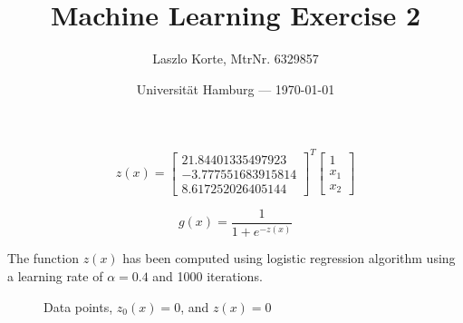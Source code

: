 \documentclass[parskip=half,a4paper]{scrartcl}
\title{Machine Learning Exercise 2}
\author{Laszlo Korte, MtrNr. 6329857}
\date{Universität Hamburg --- \today}
\begin{document}
\maketitle

$$
z(x) = \begin{bmatrix}
21.84401335497923 \\
-3.777551683915814 \\
8.617252026405144
\end{bmatrix}^T
\begin{bmatrix}
1 \\
x_1 \\
x_2
\end{bmatrix}
$$

$$
g(x) = \frac{1}{1 + e^{-z(x)}}
$$


The function $z(x)$ has been computed using logistic regression algorithm using a learning rate of $\alpha = 0.4$ and 1000 iterations.

\begin{figure}[H]
\begin{center}

\caption{Data points, $z_0(x) = 0$, and $z(x) = 0$}
\end{center}
\end{figure}
\end{document}
